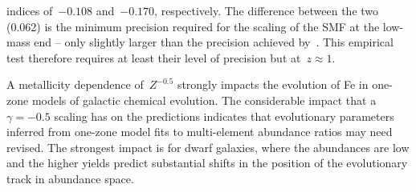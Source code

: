 indices of~$-0.108$ and~$-0.170$, respectively.
The difference between the two (0.062) is the minimum precision required for
the scaling of the SMF at the low-mass end -- only slightly larger than the
precision achieved by~\citet[][$\pm 0.05$, see their Fig. 13]{Baldry2012}.
This empirical test therefore requires at least their level of precision but
at~$z \approx 1$.
\par
A metallicity dependence of~$Z^{-0.5}$ strongly impacts the evolution of Fe
in one-zone models of galactic chemical evolution.
The considerable impact that a~$\gamma = -0.5$ scaling has on the predictions
indicates that evolutionary parameters inferred from one-zone model fits to
multi-element abundance ratios may need revised.
The strongest impact is for dwarf galaxies, where the abundances are low and
the higher yields predict substantial shifts in the position of the
evolutionary track in abundance space.

